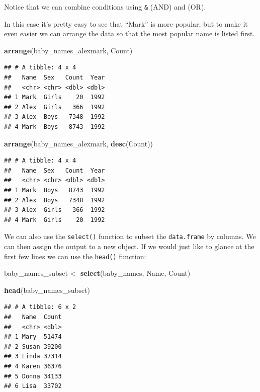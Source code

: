 \documentclass[]{book}
\newenvironment{Shaded}{\begin{snugshade}}{\end{snugshade}}
\newcommand{\KeywordTok}[1]{\textcolor[rgb]{0.13,0.29,0.53}{\textbf{#1}}}
\newcommand{\StringTok}[1]{\textcolor[rgb]{0.31,0.60,0.02}{#1}}
\newcommand{\NormalTok}[1]{#1}
\begin{document}
Notice that we can combine conditions using \texttt{\&} (AND) and
\texttt{\textbar{}} (OR).

In this case it's pretty easy to see that ``Mark'' is more popular, but
to make it even easier we can arrange the data so that the most popular
name is listed first.

\begin{Shaded}
\begin{Highlighting}[]
\KeywordTok{arrange}\NormalTok{(baby_names_alexmark, Count)}
\end{Highlighting}
\end{Shaded}

\begin{verbatim}
## # A tibble: 4 x 4
##   Name  Sex   Count  Year
##   <chr> <chr> <dbl> <dbl>
## 1 Mark  Girls    20  1992
## 2 Alex  Girls   366  1992
## 3 Alex  Boys   7348  1992
## 4 Mark  Boys   8743  1992
\end{verbatim}

\begin{Shaded}
\begin{Highlighting}[]
\KeywordTok{arrange}\NormalTok{(baby_names_alexmark, }\KeywordTok{desc}\NormalTok{(Count))}
\end{Highlighting}
\end{Shaded}

\begin{verbatim}
## # A tibble: 4 x 4
##   Name  Sex   Count  Year
##   <chr> <chr> <dbl> <dbl>
## 1 Mark  Boys   8743  1992
## 2 Alex  Boys   7348  1992
## 3 Alex  Girls   366  1992
## 4 Mark  Girls    20  1992
\end{verbatim}

We can also use the \texttt{select()} function to subset the
\texttt{data.frame} by columns. We can then assign the output to a new
object. If we would just like to glance at the first few lines we can
use the \texttt{head()} function:

\begin{Shaded}
\begin{Highlighting}[]
\NormalTok{baby_names_subset <-}\StringTok{ }\KeywordTok{select}\NormalTok{(baby_names, Name, Count)}

\KeywordTok{head}\NormalTok{(baby_names_subset)}
\end{Highlighting}
\end{Shaded}

\begin{verbatim}
## # A tibble: 6 x 2
##   Name  Count
##   <chr> <dbl>
## 1 Mary  51474
## 2 Susan 39200
## 3 Linda 37314
## 4 Karen 36376
## 5 Donna 34133
## 6 Lisa  33702
\end{verbatim}
\end{document}
